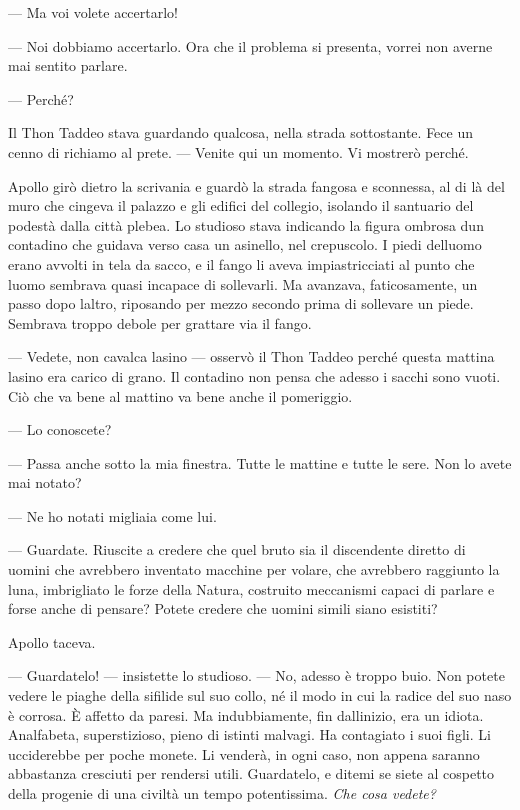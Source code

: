 	--- Ma voi volete accertarlo!
	
	--- Noi dobbiamo accertarlo. Ora che il problema si presenta, vorrei non
	averne mai sentito parlare.
	
	--- Perché?
	
	Il Thon Taddeo stava guardando qualcosa, nella strada sottostante. Fece
	un cenno di richiamo al prete. --- Venite qui un momento. Vi mostrerò
	perché.
	
	Apollo girò dietro la scrivania e guardò la strada fangosa e sconnessa,
	al di là del muro che cingeva il palazzo e gli edifici del collegio,
	isolando il santuario del podestà dalla città plebea. Lo studioso stava
	indicando la figura ombrosa d\textquotesingle un contadino che guidava
	verso casa un asinello, nel crepuscolo. I piedi
	dell\textquotesingle uomo erano avvolti in tela da sacco, e il fango li
	aveva impiastricciati al punto che l\textquotesingle uomo sembrava quasi
	incapace di sollevarli. Ma avanzava, faticosamente, un passo dopo
	l\textquotesingle altro, riposando per mezzo secondo prima di sollevare
	un piede. Sembrava troppo debole per grattare via il fango.
	
	--- Vedete, non cavalca l\textquotesingle asino --- osservò il Thon
	Taddeo perché questa mattina l\textquotesingle asino era carico di
	grano. Il contadino non pensa che adesso i sacchi sono vuoti. Ciò che va
	bene al mattino va bene anche il pomeriggio.
	
	--- Lo conoscete?
	
	--- Passa anche sotto la mia finestra. Tutte le mattine e tutte le sere.
	Non lo avete mai notato?
	
	--- Ne ho notati migliaia come lui.
	
	--- Guardate. Riuscite a credere che quel bruto sia il discendente
	diretto di uomini che avrebbero inventato macchine per volare, che
	avrebbero raggiunto la luna, imbrigliato le forze della Natura,
	costruito meccanismi capaci di parlare e forse anche di pensare? Potete
	credere che uomini simili siano esistiti?
	
	Apollo taceva.
	
	--- Guardatelo! --- insistette lo studioso. --- No, adesso è troppo
	buio. Non potete vedere le piaghe della sifilide sul suo collo, né il
	modo in cui la radice del suo naso è corrosa. È affetto da paresi. Ma
	indubbiamente, fin dall\textquotesingle inizio, era un idiota.
	Analfabeta, superstizioso, pieno di istinti malvagi. Ha contagiato i
	suoi figli. Li ucciderebbe per poche monete. Li venderà, in ogni caso,
	non appena saranno abbastanza cresciuti per rendersi utili. Guardatelo,
	e ditemi se siete al cospetto della progenie di una civiltà un tempo
	potentissima. \emph{Che cosa vedete?}
	
